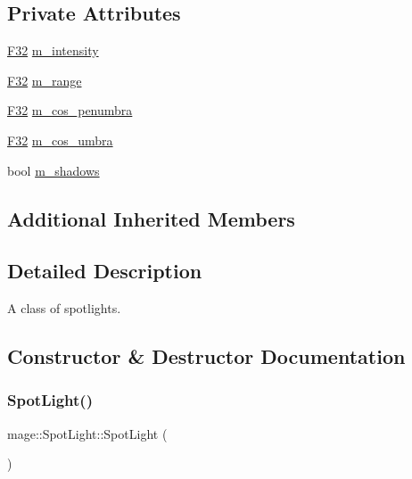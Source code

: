 \subsection*{Private Attributes}
\begin{DoxyCompactItemize}
\item 
\hyperlink{namespacemage_aa97e833b45f06d60a0a9c4fc22ae02c0}{F32} \hyperlink{classmage_1_1_spot_light_a79110b6604c73210ba13725be7b66606}{m\+\_\+intensity}
\item 
\hyperlink{namespacemage_aa97e833b45f06d60a0a9c4fc22ae02c0}{F32} \hyperlink{classmage_1_1_spot_light_a53922fe395997f12003cd2dbc2f3ca7a}{m\+\_\+range}
\item 
\hyperlink{namespacemage_aa97e833b45f06d60a0a9c4fc22ae02c0}{F32} \hyperlink{classmage_1_1_spot_light_ac4448bbc1c8a924141d2798c3365047a}{m\+\_\+cos\+\_\+penumbra}
\item 
\hyperlink{namespacemage_aa97e833b45f06d60a0a9c4fc22ae02c0}{F32} \hyperlink{classmage_1_1_spot_light_aa2ec430d0f95d082112260b5d9640d50}{m\+\_\+cos\+\_\+umbra}
\item 
bool \hyperlink{classmage_1_1_spot_light_aa744a471d0f1b39eb5ee435611bb42fe}{m\+\_\+shadows}
\end{DoxyCompactItemize}
\subsection*{Additional Inherited Members}


\subsection{Detailed Description}
A class of spotlights. 

\subsection{Constructor \& Destructor Documentation}
\hypertarget{classmage_1_1_spot_light_aa762e7cfb13da8949a9f4fb1a94c036d}{}\label{classmage_1_1_spot_light_aa762e7cfb13da8949a9f4fb1a94c036d} 
\subsubsection{\texorpdfstring{Spot\+Light()}{SpotLight()}\hspace{0.1cm}{\footnotesize\ttfamily [1/3]}}
{\footnotesize\ttfamily mage\+::\+Spot\+Light\+::\+Spot\+Light (\begin{DoxyParamCaption}{ }\end{DoxyParamCaption})}

